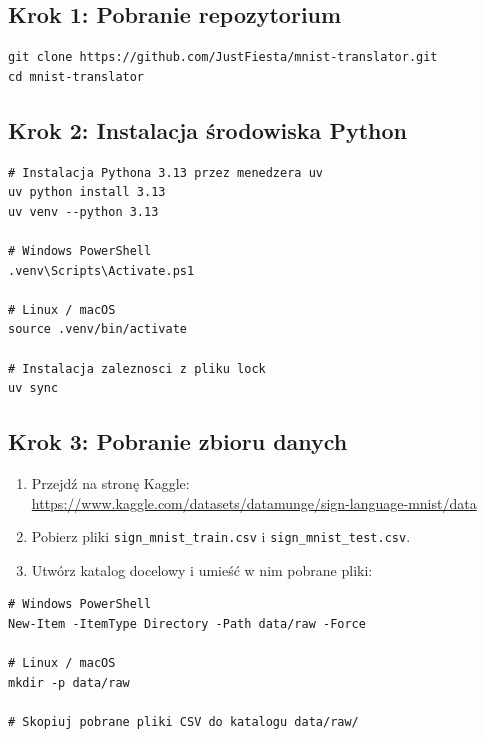 \subsection*{Krok 1: Pobranie repozytorium}

\begin{lstlisting}[style=styleBash, numbers=none, caption={Klonowanie repozytorium}, label=lst:clone]
git clone https://github.com/JustFiesta/mnist-translator.git
cd mnist-translator
\end{lstlisting}

\subsection*{Krok 2: Instalacja środowiska Python}

\begin{lstlisting}[style=styleBash, numbers=none, caption={Konfiguracja środowiska wirtualnego}, label=lst:venv]
# Instalacja Pythona 3.13 przez menedzera uv
uv python install 3.13
uv venv --python 3.13

# Windows PowerShell
.venv\Scripts\Activate.ps1

# Linux / macOS
source .venv/bin/activate

# Instalacja zaleznosci z pliku lock
uv sync
\end{lstlisting}

\subsection*{Krok 3: Pobranie zbioru danych}

\begin{enumerate}
    \item Przejdź na stronę Kaggle:\\
          \url{https://www.kaggle.com/datasets/datamunge/sign-language-mnist/data}
    \item Pobierz pliki \texttt{sign\_mnist\_train.csv} i \texttt{sign\_mnist\_test.csv}.
    \item Utwórz katalog docelowy i umieść w nim pobrane pliki:
\end{enumerate}

\begin{lstlisting}[style=styleBash, numbers=none, caption={Przygotowanie struktury katalogów na dane}, label=lst:dirs]
# Windows PowerShell
New-Item -ItemType Directory -Path data/raw -Force

# Linux / macOS
mkdir -p data/raw

# Skopiuj pobrane pliki CSV do katalogu data/raw/
\end{lstlisting}

